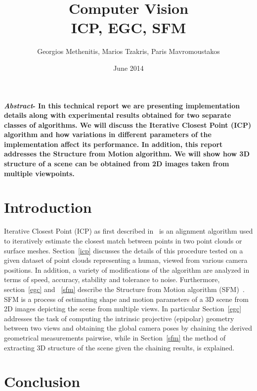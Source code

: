 \documentclass[11pt,twocolumn]{article}
\title{Computer Vision\\ICP, EGC, SFM}
\author{Georgios Methenitis, Marios Tzakris, Paris Mavromoustakos}
\affil{University of Amsterdam}
\date{June 2014}
\begin{document}
\maketitle

\renewcommand{\labelenumi}{\alph{enumi}.}



\textbf{\textit{Abstract}- In this technical report we are presenting implementation details along with experimental results obtained for two separate classes of algorithms. We will discuss the Iterative Closest Point (ICP) algorithm and how variations in different parameters of the implementation affect its performance. In addition, this report addresses the Structure from Motion algorithm. We will show how 3D structure of a scene can be obtained from 2D images taken from multiple viewpoints.}


\section{Introduction}
\label{introduction}
Iterative Closest Point (ICP) as first described in~\cite{icp} is an alignment algorithm used to iteratively estimate the closest match between points in two point clouds or surface meshes. Section~\ref{icp} discusses the details of this procedure tested on a given dataset of point clouds representing a human, viewed from various camera positions. In addition, a variety of modifications of the algorithm are analyzed in terms of speed, accuracy, stability and tolerance to noise.
Furthermore, section~\ref{egc} and ~\ref{sfm} describe the Structure from Motion algorithm (SFM)~\cite{egc}. SFM is a process of estimating shape and motion parameters of a 3D scene from 2D images depicting the scene from multiple views. In particular Section~\ref{egc} addresses the task of computing the intrinsic projective (epipolar) geometry between two views and obtaining the global camera poses by chaining the derived geometrical measurements pairwise, while in Section~\ref{sfm} the method of extracting 3D structure of the scene given the chaining results, is explained.











\section{Conclusion}
\label{conclusion}
\end{document}

